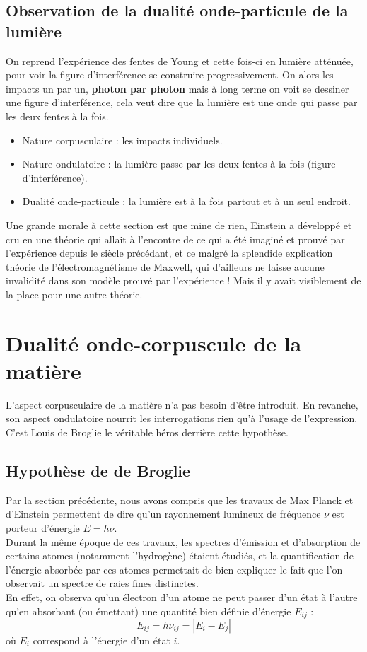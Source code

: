 \documentclass[12pt, a4paper]{book}
\begin{document}
\subsection{Observation de la dualité onde-particule de la lumière}
On reprend l'expérience des fentes de Young et cette fois-ci en lumière atténuée, pour voir la figure d'interférence se construire progressivement. On alors les impacts un par un, \textbf{photon par photon} mais à long terme on voit se dessiner une figure d'interférence, cela veut dire que la lumière est une onde qui passe par les deux fentes à la fois.

\begin{itemize}
\item Nature corpusculaire : les impacts individuels.
\item Nature ondulatoire : la lumière passe par les deux fentes à la fois (figure d'interférence).
\item Dualité onde-particule : la lumière est à la fois partout et à un seul endroit. \end{itemize}

Une grande morale à cette section est que mine de rien, Einstein a développé et cru en une théorie qui allait à l'encontre de ce qui a été imaginé et prouvé par l'expérience depuis le siècle précédant, et ce malgré la splendide explication théorie de l'électromagnétisme de Maxwell, qui d'ailleurs ne laisse aucune invalidité dans son modèle prouvé par l'expérience ! Mais il y avait visiblement de la place pour une autre théorie. 

\section{Dualité onde-corpuscule de la matière}
L'aspect corpusculaire de la matière n'a pas besoin d'être introduit. En revanche, son aspect ondulatoire nourrit les interrogations rien qu'à l'usage de l'expression. C'est Louis de Broglie le véritable héros derrière cette hypothèse.

\subsection{Hypothèse de de Broglie}

Par la section précédente, nous avons compris que les travaux de Max Planck et d'Einstein permettent de dire qu'un rayonnement lumineux de fréquence $\nu$ est porteur d'énergie $E = h \nu$. \\
Durant la même époque de ces travaux, les spectres d'émission et d'absorption de certains atomes (notamment l'hydrogène) étaient étudiés, et la quantification de l'énergie absorbée par ces atomes permettait de bien expliquer le fait que l'on observait un spectre de raies fines distinctes. \\
En effet, on observa qu'un électron d'un atome ne peut passer d'un état à l'autre qu'en absorbant (ou émettant) une quantité bien définie d'énergie $E_{ij}$ : 
$$E_{ij} = h\nu_{ij} = |E_i - E_j|$$
où $E_i$ correspond à l'énergie d'un état $i$. \\
\end{document}

